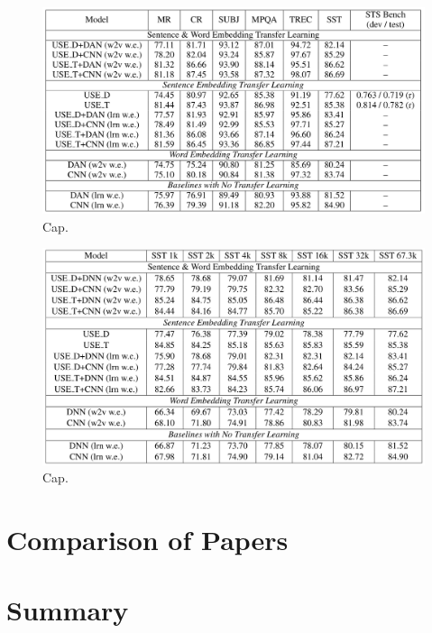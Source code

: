 \begin{figure}
\centering
  \includegraphics[width=.5\linewidth]{files/use-2.png}
  \caption{Cap.}
  \label{fig:vae}
\end{figure}

\begin{figure}
\centering
  \includegraphics[width=.5\linewidth]{files/use-3.png}
  \caption{Cap.}
  \label{fig:vae}
\end{figure}

\section{\label{sec:level5} Comparison of Papers}

\section{\label{sec:level6} Summary}
